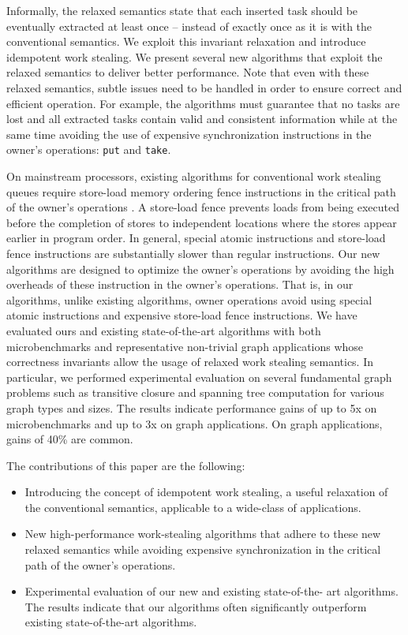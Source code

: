 Informally, the relaxed semantics state that each inserted task should
be eventually extracted at least once -- instead of exactly once as it
is with the conventional semantics. We exploit this invariant
relaxation and introduce idempotent work stealing. We present several
new algorithms that exploit the relaxed semantics to deliver better
performance. Note that even with these relaxed semantics, subtle
issues need to be handled in order to ensure correct and efficient
operation. For example, the algorithms must guarantee that no tasks
are lost and all extracted tasks contain valid and consistent
information while at the same time avoiding the use of expensive
synchronization instructions in the owner's operations:
\lstinline!put! and \lstinline!take!.

On mainstream processors, existing algorithms for conventional work
stealing queues require store-load memory ordering fence instructions
in the critical path of the owner's operations \cite{Arora2001,
  Chase2005, Frigo1998, Hendler2006, Hendler2002}. A store-load fence
prevents loads from being executed before the completion of stores to
independent locations where the stores appear earlier in program
order. In general, special atomic instructions and store-load fence
instructions are substantially slower than regular instructions. Our
new algorithms are designed to optimize the owner's operations by
avoiding the high overheads of these instruction in the owner's
operations. That is, in our algorithms, unlike existing algorithms,
owner operations avoid using special atomic instructions and expensive
store-load fence instructions. We have evaluated ours and existing
state-of-the-art algorithms with both microbenchmarks and
representative non-trivial graph applications whose correctness
invariants allow the usage of relaxed work stealing semantics. In
particular, we performed experimental evaluation on several
fundamental graph problems such as transitive closure and spanning
tree computation for various graph types and sizes. The results
indicate performance gains of up to 5x on microbenchmarks and up to 3x
on graph applications. On graph applications, gains of 40\% are
common.

The contributions of this paper are the following:
\begin{itemize}
\item Introducing the concept of idempotent work stealing, a useful
 relaxation of the conventional semantics, applicable to a wide-class
  of applications.
\item New high-performance work-stealing algorithms that adhere to
  these new relaxed semantics while avoiding expensive synchronization
  in the critical path of the owner's operations.
\item Experimental evaluation of our new and existing state-of-the-
  art algorithms. The results indicate that our algorithms often
  significantly outperform existing state-of-the-art algorithms.
\end{itemize}

